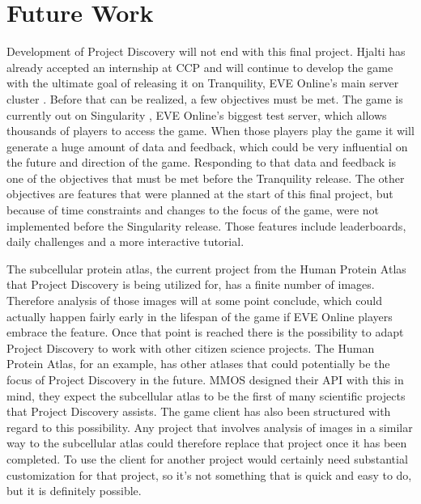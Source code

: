 \section{Future Work}\label{sec:futurework}
Development of Project Discovery will not end with this final project. Hjalti has already accepted an internship at CCP and will continue to develop the game with the ultimate goal of releasing it on Tranquility, EVE Online's main server cluster \cite{tranquility}. Before that can be realized, a few objectives must be met. The game is currently out on Singularity \cite{singularity}, EVE Online's biggest test server, which allows thousands of players to access the game. When those players play the game it will generate a huge amount of data and feedback, which could be very influential on the future and direction of the game. Responding to that data and feedback is one of the objectives that must be met before the Tranquility release. The other objectives are features that were planned at the start of this final project, but because of time constraints and changes to the focus of the game, were not implemented before the Singularity release. Those features include leaderboards, daily challenges and a more interactive tutorial. 

The subcellular protein atlas, the current project from the Human Protein Atlas that Project Discovery is being utilized for, has a finite number of images. Therefore analysis of those images will at some point conclude, which could actually happen fairly early in the lifespan of the game if EVE Online players embrace the feature. Once that point is reached there is the possibility to adapt Project Discovery to work with other citizen science projects. The Human Protein Atlas, for an example, has other atlases that could potentially be the focus of Project Discovery in the future. MMOS designed their API with this in mind, they expect the subcellular atlas to be the first of many scientific projects that Project Discovery assists. The game client has also been structured with regard to this possibility. Any project that involves analysis of images in a similar way to the subcellular atlas could therefore replace that project once it has been completed. To use the client for another project would certainly need substantial customization for that project, so it's not something that is quick and easy to do, but it is definitely possible.
